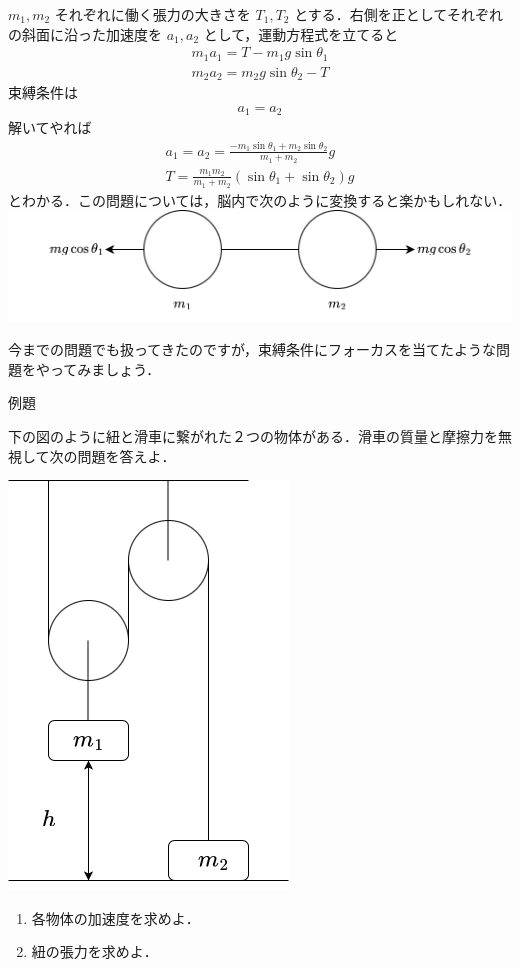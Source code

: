 \documentclass[
  b4paperpaper,
  xelatex,ja=standard]{bxjsbook}
\providecommand{\tightlist}{%
  \setlength{\itemsep}{0pt}\setlength{\parskip}{0pt}}\usepackage{longtable,booktabs,array}
\begin{document}
\(m_1,m_2\) それぞれに働く張力の大きさを \(T_1,T_2\)
とする．右側を正としてそれぞれの斜面に沿った加速度を \(a_1,a_2\)
として，運動方程式を立てると \begin{align*}
m_1a_1=T-m_1g\sin \theta_1\\
m_2a_2=m_2g\sin \theta_2-T
\end{align*} 束縛条件は \begin{align*}
a_1=a_2
\end{align*} 解いてやれば \begin{align*}
a_1=a_2=\frac{-m_1\sin \theta_1+m_2\sin \theta_2}{m_1+m_2}g\\
T=\frac{m_1m_2}{m_1+m_2}(\sin \theta_1+\sin \theta_2)g
\end{align*}
とわかる．この問題については，脳内で次のように変換すると楽かもしれない．
\includegraphics{source/images/newton/newton8.png}

今までの問題でも扱ってきたのですが，束縛条件にフォーカスを当てたような問題をやってみましょう．

\begin{Rbox}{例題}

下の図のように紐と滑車に繋がれた２つの物体がある．滑車の質量と摩擦力を無視して次の問題を答えよ．

\includegraphics{source/images/newton/newton9.png}

\begin{enumerate}
\def\labelenumi{\arabic{enumi}.}
\tightlist
\item
  各物体の加速度を求めよ．
\item
  紐の張力を求めよ．
\end{enumerate}

\end{Rbox}
\end{document}
